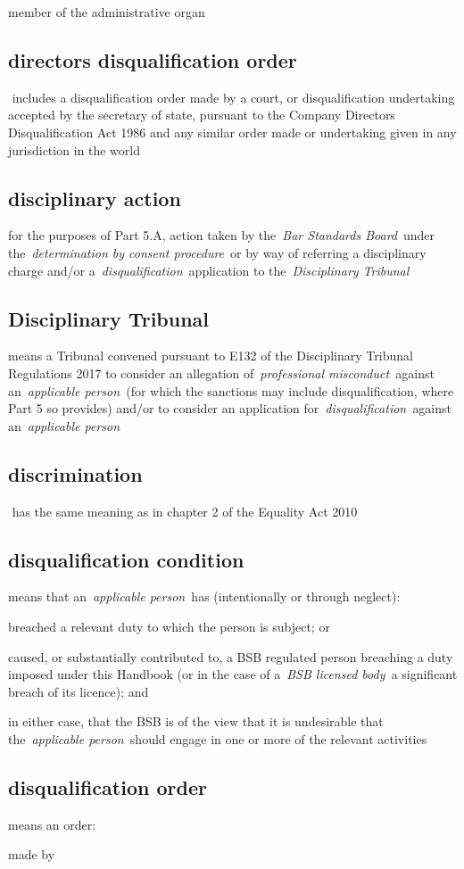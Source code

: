   member of the administrative organ\la  \subsection{directors disqualification order } includes a
  disqualification order made by a court, or disqualification
  undertaking accepted by the secretary of state, pursuant to the
  Company Directors Disqualification Act 1986 and any similar order made
  or undertaking given in any jurisdiction in the world  \subsection{disciplinary action }for the purposes of Part 5.A, action
  taken by the~\emph{Bar Standards Board}~under the~\emph{determination
  by consent procedure}~or by way of referring a disciplinary charge
  and/or a~\emph{disqualification}~application to the~\emph{Disciplinary
  Tribunal} \subsection{Disciplinary Tribunal } means a Tribunal convened pursuant to
  E132 of the Disciplinary Tribunal Regulations 2017 to consider an
  allegation of~\emph{professional misconduct~}against
  an~\emph{applicable person~}(for which the sanctions may include
  disqualification, where Part 5 so provides) and/or to consider an
  application for~\emph{disqualification~}against an~\emph{applicable
  person} \subsection{discrimination } has the same meaning as in chapter 2 of the
  Equality Act 2010  \subsection{disqualification condition } means that an~\emph{applicable
  person~}has (intentionally or through neglect): \al \item breached a relevant
  duty to which the person is subject; or \item caused, or substantially
  contributed to, a BSB regulated person breaching a duty imposed under
  this Handbook (or in the case of a~\emph{BSB licensed body~}a
  significant breach of its licence); and \item in either case, that the
  BSB is of the view that it is undesirable that the~\emph{applicable
  person~}should engage in one or more of the relevant activities\la  \subsection{disqualification order } means an order: \al \item made by
